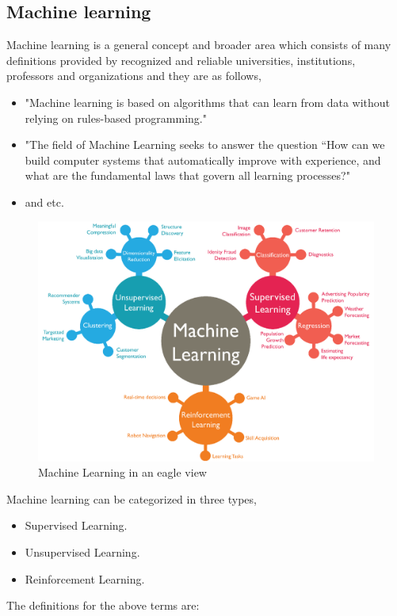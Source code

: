 \documentclass[format=sigconf]{acmart}
\begin{document}
\subsection{Machine learning}
Machine learning is a general concept and broader area which consists of many definitions provided by recognized and reliable 
universities, institutions, professors and organizations and they are as follows,
\begin{itemize}
    \item "Machine learning is based on algorithms that can learn from data without relying on rules-based programming." \cite{machineLearning1}
    \item "The field of Machine Learning seeks to answer the question “How can we build computer systems that automatically 
           improve with experience, and what are the fundamental laws that govern all learning processes?" \cite{machineLearning2}
    \item and etc.
\end{itemize}
\begin{figure}[H]
    \centering
    \includegraphics[scale=0.70]{Machine_Learning.png}
    \caption{Machine Learning in an eagle view}
    \label{fig:ml}
\end{figure}
Machine learning can be categorized in three types,
\begin{itemize}
    \item Supervised Learning.
    \item Unsupervised Learning.
    \item Reinforcement Learning.
\end{itemize}
The definitions for the above terms are:
\end{document}
